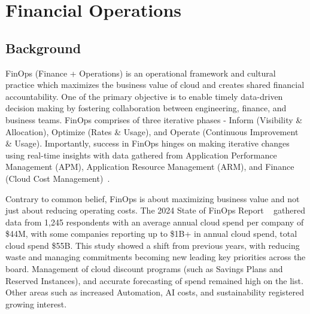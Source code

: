 \section{Financial Operations}
\label{appx:finops}

\subsection{Background}
\label{ss:finops-background}

FinOps (Finance + Operations) is an operational framework and cultural practice which maximizes the business value of cloud and creates shared financial accountability. One of the primary objective is to enable timely data-driven decision making  by fostering collaboration between engineering, finance, and business teams.  FinOps comprises of three iterative phases - Inform (Visibility \& Allocation), Optimize (Rates \& Usage), and Operate (Continuous Improvement \& Usage). 
Importantly, success in FinOps hinges on making iterative changes using real-time insights with data gathered from Application Performance Management (APM), Application Resource Management (ARM), and Finance (Cloud Cost Management)~\cite{cloud_finops_2nd}. 


Contrary to common belief, FinOps is about maximizing business value and not just about reducing operating costs.
The 2024 State of FinOps Report ~\cite{finops_data, finops_insights_2024} gathered data from 1,245  respondents with an average annual cloud spend per company of \$44M, with some companies reporting up to \$1B+ in annual cloud spend, total cloud spend \$55B. This study showed a shift from previous years, with reducing waste and managing commitments becoming new leading key priorities across the board. 
Management of cloud discount programs (such as Savings Plans and Reserved Instances), and accurate forecasting of spend remained high on the list. 
 Other areas such as increased Automation, AI costs, and sustainability registered growing interest.
